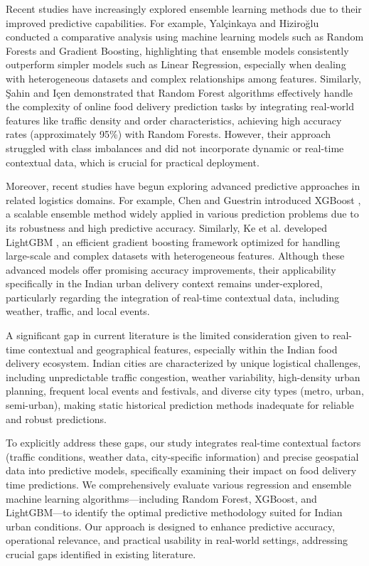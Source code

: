 \documentclass[10pt,twocolumn,letterpaper]{article}
\begin{document}
Recent studies have increasingly explored ensemble learning methods due to their improved predictive capabilities. For example, Yalçinkaya and Hiziroğlu \cite{dergipark1} conducted a comparative analysis using machine learning models such as Random Forests and Gradient Boosting, highlighting that ensemble models consistently outperform simpler models such as Linear Regression, especially when dealing with heterogeneous datasets and complex relationships among features. Similarly, Şahin and Içen \cite{dergipark2} demonstrated that Random Forest algorithms effectively handle the complexity of online food delivery prediction tasks by integrating real-world features like traffic density and order characteristics, achieving high accuracy rates (approximately 95\%) with Random Forests. However, their approach struggled with class imbalances and did not incorporate dynamic or real-time contextual data, which is crucial for practical deployment.

Moreover, recent studies have begun exploring advanced predictive approaches in related logistics domains. For example, Chen and Guestrin introduced XGBoost \cite{xgboost}, a scalable ensemble method widely applied in various prediction problems due to its robustness and high predictive accuracy. Similarly, Ke et al. developed LightGBM \cite{lightgbm}, an efficient gradient boosting framework optimized for handling large-scale and complex datasets with heterogeneous features. Although these advanced models offer promising accuracy improvements, their applicability specifically in the Indian urban delivery context remains under-explored, particularly regarding the integration of real-time contextual data, including weather, traffic, and local events.

A significant gap in current literature is the limited consideration given to real-time contextual and geographical features, especially within the Indian food delivery ecosystem. Indian cities are characterized by unique logistical challenges, including unpredictable traffic congestion, weather variability, high-density urban planning, frequent local events and festivals, and diverse city types (metro, urban, semi-urban), making static historical prediction methods inadequate for reliable and robust predictions.

To explicitly address these gaps, our study integrates real-time contextual factors (traffic conditions, weather data, city-specific information) and precise geospatial data into predictive models, specifically examining their impact on food delivery time predictions. We comprehensively evaluate various regression and ensemble machine learning algorithms—including Random Forest, XGBoost, and LightGBM—to identify the optimal predictive methodology suited for Indian urban conditions. Our approach is designed to enhance predictive accuracy, operational relevance, and practical usability in real-world settings, addressing crucial gaps identified in existing literature.
\end{document}
